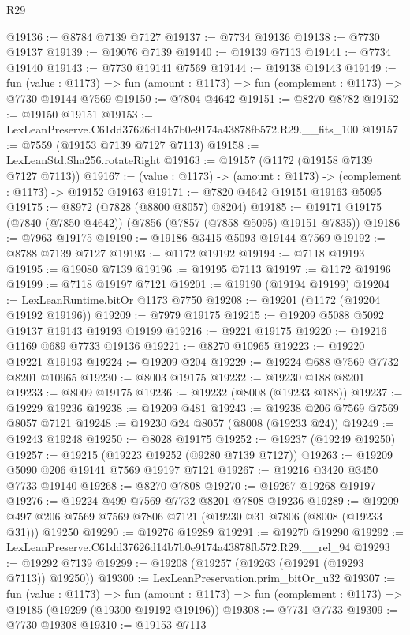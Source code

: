 \begin{lexlean}{R29}
\begin{coremodule}
@19136 := @8784 @7139 @7127
@19137 := @7734 @19136
@19138 := @7730 @19137
@19139 := @19076 @7139
@19140 := @19139 @7113
@19141 := @7734 @19140
@19143 := @7730 @19141 @7569
@19144 := @19138 @19143
@19149 := fun (value : @1173) =>
  fun (amount : @1173) => fun (complement : @1173) => @7730 @19144 @7569
@19150 := @7804 @4642
@19151 := @8270 @8782
@19152 := @19150 @19151
@19153 := LexLeanPreserve.C61dd37626d14b7b0e9174a43878fb572.R29.__fits_100
@19157 := @7559 (@19153 @7139 @7127 @7113)
@19158 := LexLeanStd.Sha256.rotateRight
@19163 := @19157 (@1172 (@19158 @7139 @7127 @7113))
@19167 := (value : @1173) -> (amount : @1173) -> (complement : @1173) -> @19152 @19163
@19171 := @7820 @4642 @19151 @19163 @5095
@19175 := @8972 (@7828 (@8800 @8057) @8204)
@19185 := @19171 @19175 (@7840 (@7850 @4642)) (@7856 (@7857 (@7858 @5095) @19151 @7835))
@19186 := @7963 @19175
@19190 := @19186 @3415 @5093 @19144 @7569
@19192 := @8788 @7139 @7127
@19193 := @1172 @19192
@19194 := @7118 @19193
@19195 := @19080 @7139
@19196 := @19195 @7113
@19197 := @1172 @19196
@19199 := @7118 @19197 @7121
@19201 := @19190 (@19194 @19199)
@19204 := LexLeanRuntime.bitOr @1173 @7750
@19208 := @19201 (@1172 (@19204 @19192 @19196))
@19209 := @7979 @19175
@19215 := @19209 @5088 @5092 @19137 @19143 @19193 @19199
@19216 := @9221 @19175
@19220 := @19216 @1169 @689 @7733 @19136
@19221 := @8270 @10965
@19223 := @19220 @19221 @19193
@19224 := @19209 @204
@19229 := @19224 @688 @7569 @7732 @8201 @10965
@19230 := @8003 @19175
@19232 := @19230 @188 @8201
@19233 := @8009 @19175
@19236 := @19232 (@8008 (@19233 @188))
@19237 := @19229 @19236
@19238 := @19209 @481
@19243 := @19238 @206 @7569 @7569 @8057 @7121
@19248 := @19230 @24 @8057 (@8008 (@19233 @24))
@19249 := @19243 @19248
@19250 := @8028 @19175
@19252 := @19237 (@19249 @19250)
@19257 := @19215 (@19223 @19252 (@9280 @7139 @7127))
@19263 := @19209 @5090 @206 @19141 @7569 @19197 @7121
@19267 := @19216 @3420 @3450 @7733 @19140
@19268 := @8270 @7808
@19270 := @19267 @19268 @19197
@19276 := @19224 @499 @7569 @7732 @8201 @7808 @19236
@19289 := @19209 @497 @206 @7569 @7569 @7806 @7121 (@19230 @31 @7806 (@8008 (@19233 @31))) @19250
@19290 := @19276 @19289
@19291 := @19270 @19290
@19292 := LexLeanPreserve.C61dd37626d14b7b0e9174a43878fb572.R29.__rel_94
@19293 := @19292 @7139
@19299 := @19208 (@19257 (@19263 (@19291 (@19293 @7113)) @19250))
@19300 := LexLeanPreservation.prim_bitOr_u32
@19307 := fun (value : @1173) =>
  fun (amount : @1173) => fun (complement : @1173) => @19185 (@19299 (@19300 @19192 @19196))
@19308 := @7731 @7733
@19309 := @7730 @19308
@19310 := @19153 @7113

\end{coremodule}
\end{lexlean}
